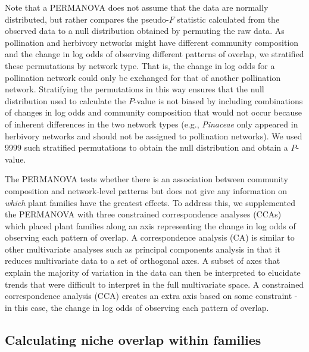 \documentclass[12pt]{article}
\begin{document}
\begin{spacing}{1.5}
  Note that a PERMANOVA does not assume that the data are 
  normally distributed, but rather compares the pseudo-$F$ 
  statistic calculated from the observed data to a null 
  distribution obtained by permuting the raw data. As 
  pollination and herbivory networks might have different
  community composition and the change in log odds of observing
  different patterns of overlap, we stratified these permutations
  by network type. That is, the change in log odds for a pollination
  network could only be exchanged for that of another pollination
  network. Stratifying the permutations in this way ensures that 
  the null distribution used to calculate the $P$-value is not 
  biased by including combinations of changes in log odds and 
  community composition that would not occur because of inherent 
  differences in the two network types (e.g., \emph{Pinaceae} 
  only appeared in herbivory networks and should not be assigned 
  to pollination networks). We used 9999 such stratified permutations 
  to obtain the null distribution and obtain a $P$-value.


  The PERMANOVA tests whether there is an association between
  community composition and network-level patterns but does not
  give any information on \emph{which} plant families have the
  greatest effects. To address this, we supplemented the 
  PERMANOVA with three constrained correspondence analyses (CCAs)
  which placed plant families along an axis representing the
  change in log odds of observing each pattern of overlap.
  A correspondence 
  analysis (CA) is similar to other multivariate
  analyses such as principal components analysis in that it
  reduces multivariate data to a set of orthogonal axes. A
  subset of axes that explain the majority of variation in 
  the data can then be interpreted to elucidate trends that
  were difficult to interpret in the full multivariate space.
  A constrained correspondence analysis (CCA) creates an extra
  axis based on some constraint - in this case, the change in
  log odds of observing each pattern of overlap. 


\subsection*{Calculating niche overlap within families}


\end{spacing}
\end{document}
